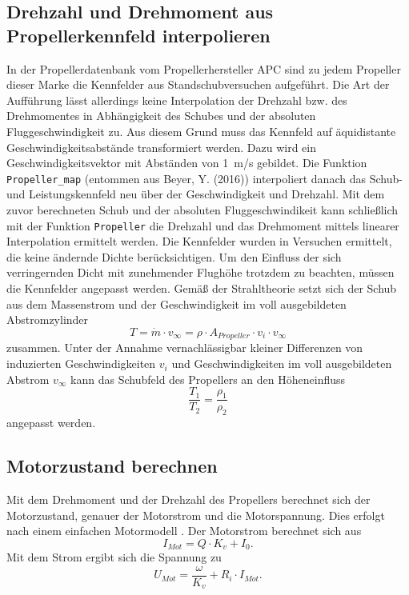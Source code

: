 \subsection{Drehzahl und Drehmoment aus Propellerkennfeld interpolieren}
In der Propellerdatenbank vom Propellerhersteller APC sind zu jedem Propeller dieser Marke die Kennfelder aus Standschubversuchen aufgeführt. Die Art der Aufführung lässt allerdings keine Interpolation der Drehzahl bzw. des Drehmomentes in Abhängigkeit des Schubes und der absoluten Fluggeschwindigkeit zu. Aus diesem Grund muss das Kennfeld auf äquidistante Geschwindigkeitsabstände transformiert werden. Dazu wird ein Geschwindigkeitsvektor mit Abständen von \SI{1}{m/s} gebildet. Die Funktion \texttt{Propeller\_map} (entommen aus Beyer, Y. (2016)) interpoliert danach das Schub- und Leistungskennfeld neu über der Geschwindigkeit und Drehzahl. Mit dem zuvor berechneten Schub und der absoluten Fluggeschwindikeit kann schließlich mit der Funktion \texttt{Propeller} die Drehzahl und das Drehmoment mittels linearer Interpolation ermittelt werden.
Die Kennfelder wurden in Versuchen ermittelt, die keine ändernde Dichte berücksichtigen. Um den Einfluss der sich verringernden Dicht mit zunehmender Flughöhe trotzdem zu beachten, müssen die Kennfelder angepasst werden. Gemäß der Strahltheorie setzt sich der Schub aus dem Massenstrom und der Geschwindigkeit im voll ausgebildeten Abstromzylinder 
\begin{equation}
	T =  \dot{m}\cdot v_{\infty} = \rho\cdot A_{Propeller}\cdot v_i\cdot v_{\infty}
\end{equation}
zusammen. Unter der Annahme vernachlässigbar kleiner Differenzen von  induzierten Geschwindigkeiten $v_i$ und Geschwindigkeiten im voll ausgebildeten Abstrom $v_{\infty}$ kann das Schubfeld des Propellers an den Höheneinfluss 
\begin{equation}
	\frac{T_1}{T_2} = \frac{\rho_1}{\rho_2}
\end{equation}
angepasst werden.


\subsection{Motorzustand berechnen}
Mit dem Drehmoment und der Drehzahl des Propellers berechnet sich der Motorzustand, genauer der Motorstrom und die Motorspannung. Dies erfolgt nach einem einfachen Motormodell \cite{Drela.2007}.
Der Motorstrom berechnet sich aus 
\begin{equation}
	I_{Mot} = Q\cdot K_v + I_0.
\end{equation}
Mit dem Strom ergibt sich die Spannung zu
\begin{equation}
	U_{Mot} = \frac{\omega}{K_v} + R_i\cdot I_{Mot}.
\end{equation}



